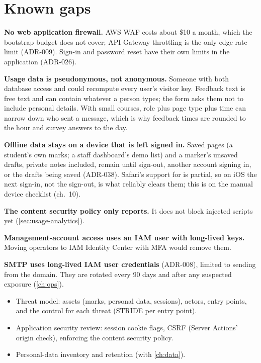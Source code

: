 \section{Known gaps}
\begin{risk}
  \textbf{No web application firewall.} AWS WAF costs about \$10 a month, which the bootstrap
  budget does not cover; API Gateway throttling is the only edge rate limit (ADR-009). Sign-in and
  password reset have their own limits in the application (ADR-026).
\end{risk}
\begin{risk}
  \textbf{Usage data is pseudonymous, not anonymous.} Someone with both database access and
   could recompute every user's visitor key. Feedback text is free text
  and can contain whatever a person types; the form asks them not to include personal details.
  With small courses, role plus page type plus time can narrow down who sent a message, which is
  why feedback times are rounded to the hour and survey answers to the day.
\end{risk}
\begin{risk}
  \textbf{Offline data stays on a device that is left signed in.} Saved pages (a student's own
  marks; a staff dashboard's demo list) and a marker's unsaved drafts, private notes included,
  remain until sign-out, another account signing in, or the drafts being saved (ADR-038).
  Safari's support for  is partial, so on iOS the next sign-in, not the
  sign-out, is what reliably clears them; this is on the manual device checklist (ch.~10).
\end{risk}
\begin{risk}
  \textbf{The content security policy only reports.} It does not block injected scripts yet
  (\cref{sec:usage-analytics}).
\end{risk}
\begin{risk}
  \textbf{Management-account access uses an IAM user with long-lived keys.} Moving operators to
  IAM Identity Center with MFA would remove them.
\end{risk}
\begin{risk}
  \textbf{SMTP uses long-lived IAM user credentials} (ADR-008), limited to sending from the
  domain. They are rotated every 90 days and after any suspected exposure (\cref{ch:ops}).
\end{risk}

\begin{todo}
  \begin{itemize}
    \item Threat model: assets (marks, personal data, sessions), actors, entry points, and the
      control for each threat (STRIDE per entry point).
    \item Application security review: session cookie flags, CSRF (Server Actions' origin check),
      enforcing the content security policy.
    \item Personal-data inventory and retention (with \cref{ch:data}).
  \end{itemize}
\end{todo}
